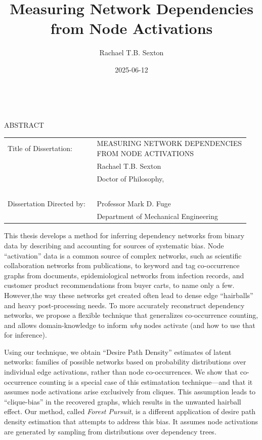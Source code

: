 \documentclass[%
	12pt,
		oneside,
		letterpaper
]{book}
\title{Measuring Network Dependencies from Node Activations}
\author{Rachael T.B. Sexton}
\date{2025-06-12}
\begin{document}
\pagestyle{empty}
\singlespacing

\hbox{\ }

\begin{center}
\large{{ABSTRACT}}

\vspace{3em}

\end{center}
\hspace{-.15in}
\begin{tabular}{p{0.35\linewidth}p{0.6\linewidth}}
Title of Dissertation:     & {\large \uppercase{Measuring Network
Dependencies from Node Activations}}\\
                           & {\large  Rachael T.B. Sexton } \\
                           & {\large Doctor of Philosophy, } \\
\                         \\
Dissertation Directed by:  & {\large Professor Mark D. Fuge } \\
                           & {\large Department of Mechanical
Engineering} \\
\end{tabular}

\vspace{3em}


\doublespacing
\large \normalsize
This thesis develops a method for inferring dependency networks from
binary data by describing and accounting for sources of systematic bias.
Node ``activation'' data is a common source of complex networks, such as
scientific collaboration networks from publications, to keyword and tag
co-occurrence graphs from documents, epidemiological networks from
infection records, and customer product recommendations from buyer
carts, to name only a few. However,the way these networks get created
often lead to dense edge ``hairballs'' and heavy post-processing needs.
To more accurately reconstruct dependency networks, we propose a
flexible technique that generalizes co-occurrence counting, and allows
domain-knowledge to inform \emph{why} nodes activate (and how to use
that for inference).

Using our technique, we obtain ``Desire Path Density'' estimates of
latent networks: families of possible networks based on probability
distributions over individual edge activations, rather than node
co-occurrences. We show that co-occurrence counting is a special case of
this estimatation technique---and that it assumes node activations arise
exclusively from cliques. This assumption leads to ``clique-bias'' in
the recovered graphs, which results in the unwanted hairball effect. Our
method, called \emph{Forest Pursuit}, is a different application of
desire path density estimation that attempts to address this bias. It
assumes node activations are generated by sampling from distributions
over dependency trees.
\end{document}
